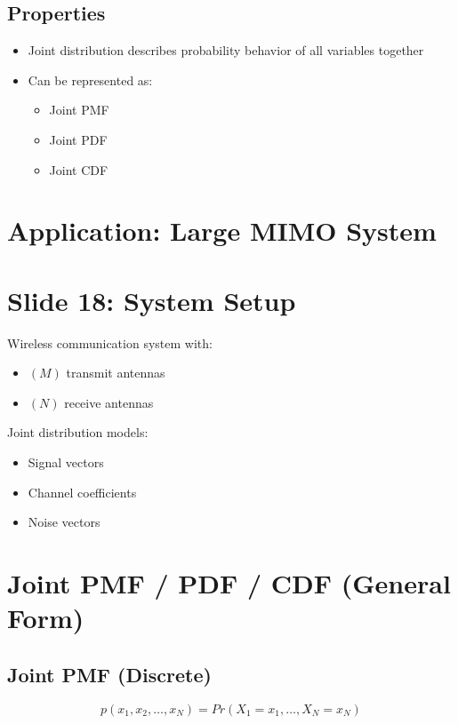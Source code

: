 \documentclass[12pt]{article}
\begin{document}
\subsection*{Properties}

\begin{itemize}
\item Joint distribution describes probability behavior of all variables together
\item Can be represented as:
\begin{itemize}
\item Joint PMF
\item Joint PDF
\item Joint CDF
\end{itemize}
\end{itemize}

\section*{Application: Large MIMO System}

\section*{Slide 18: System Setup}

Wireless communication system with:

\begin{itemize}
\item $(M)$ transmit antennas
\item $(N)$ receive antennas
\end{itemize}

Joint distribution models:

\begin{itemize}
\item Signal vectors
\item Channel coefficients
\item Noise vectors
\end{itemize}

\section*{Joint PMF / PDF / CDF (General Form)}

\subsection*{Joint PMF (Discrete)}

\[
p(x_1, x_2, \dots, x_N) = Pr(X_1=x_1, \dots, X_N=x_N)
\]
\end{document}

